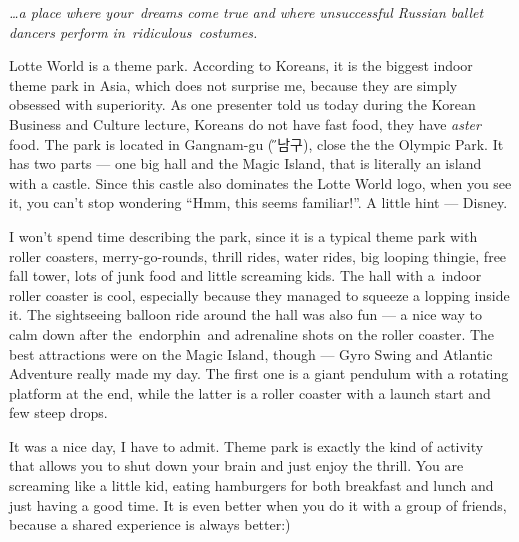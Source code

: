 \begin{post}
	\begin{content}
\textit{{\ldots}a place where your dreams come true and where unsuccessful Russian ballet dancers perform in ridiculous costumes.}

\begin{figure}
\vspace{-12pt}\centering{}
\vspace{-24pt}
\end{figure}Lotte World is a theme park. According to Koreans, it is the biggest indoor theme park in Asia, which does not surprise me, because they are simply obsessed with superiority. As one presenter told us today during the Korean Business and Culture lecture, Koreans do not have fast food, they have \textit{aster} food. The park is located in Gangnam-gu ({\H 강남구}), close the the Olympic Park. It has two parts --- one big hall and the Magic Island, that is literally an island with a castle. Since this castle also dominates the Lotte World logo, when you see it, you can't stop wondering ``Hmm, this seems familiar!''. A little hint --- Disney.

I won't spend time describing the park, since it is a typical theme park with roller coasters, merry-go-rounds, thrill rides, water rides, big looping thingie, free fall tower, lots of junk food and little screaming kids. The hall with a indoor roller coaster is cool, especially because they managed to squeeze a lopping inside it. The sightseeing balloon ride around the hall was also fun --- a nice way to calm down after the endorphin and adrenaline shots on the roller coaster. The best attractions were on the Magic Island, though --- Gyro Swing and Atlantic Adventure really made my day. The first one is a giant pendulum with a rotating platform at the end, while the latter is a roller coaster with a launch start and few steep drops.

It was a nice day, I have to admit. Theme park is exactly the kind of activity that allows you to shut down your brain and just enjoy the thrill. You are screaming like a little kid, eating hamburgers for both breakfast and lunch and just having a good time. It is even better when you do it with a group of friends, because a shared experience is always better:)


\end{content}
\end{post}
